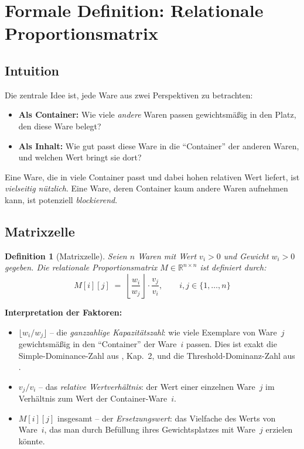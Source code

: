 \documentclass[a4paper,11pt]{article}
\newtheorem{definition}{Definition}
\begin{document}
\section{Formale Definition: Relationale Proportionsmatrix}
\label{sec:formal}

\subsection{Intuition}

Die zentrale Idee ist, jede Ware aus zwei Perspektiven zu betrachten:

\begin{itemize}[leftmargin=*,topsep=2pt]
  \item \textbf{Als Container:} Wie viele \emph{andere} Waren passen
    gewichtsmäßig in den Platz, den diese Ware belegt?
  \item \textbf{Als Inhalt:} Wie gut passt diese Ware in die
    ``Container'' der anderen Waren, und welchen Wert bringt sie dort?
\end{itemize}

\noindent
Eine Ware, die in viele Container passt und dabei hohen relativen
Wert liefert, ist \emph{vielseitig nützlich}. Eine Ware, deren
Container kaum andere Waren aufnehmen kann, ist potenziell
\emph{blockierend}.

\subsection{Matrixzelle}

\begin{mdframed}[backgroundcolor=matlight,linecolor=matblue,linewidth=1.2pt]
\begin{definition}[Matrixzelle]
\label{def:zelle}
Seien $n$ Waren mit Wert $v_i > 0$ und Gewicht $w_i > 0$ gegeben.
Die \emph{relationale Proportionsmatrix} $M \in \mathbb{R}^{n \times n}$
ist definiert durch:
\[
M[i][j] \;=\; \left\lfloor \frac{w_i}{w_j} \right\rfloor
\cdot \frac{v_j}{v_i},
\qquad i,j \in \{1,\ldots,n\}
\]
\end{definition}
\end{mdframed}

\medskip
\noindent
\textbf{Interpretation der Faktoren:}

\begin{itemize}[leftmargin=*,topsep=4pt]
  \item $\lfloor w_i / w_j \rfloor$ -- die
    \emph{ganzzahlige Kapazitätszahl}: wie viele Exemplare
    von Ware~$j$ gewichtsmäßig in den ``Container'' der
    Ware~$i$ passen. Dies ist exakt die Simple-Dominance-Zahl
    aus \citet{kellerer2004}, Kap.~2, und die
    Threshold-Dominanz-Zahl aus \citet{andonov2000}.
  \item $v_j / v_i$ -- das \emph{relative Wertverhältnis}: der
    Wert einer einzelnen Ware~$j$ im Verhältnis zum Wert der
    Container-Ware~$i$.
  \item $M[i][j]$ insgesamt -- der \emph{Ersetzungswert}: das
    Vielfache des Werts von Ware~$i$, das man durch Befüllung
    ihres Gewichtsplatzes mit Ware~$j$ erzielen könnte.
\end{itemize}
\end{document}
